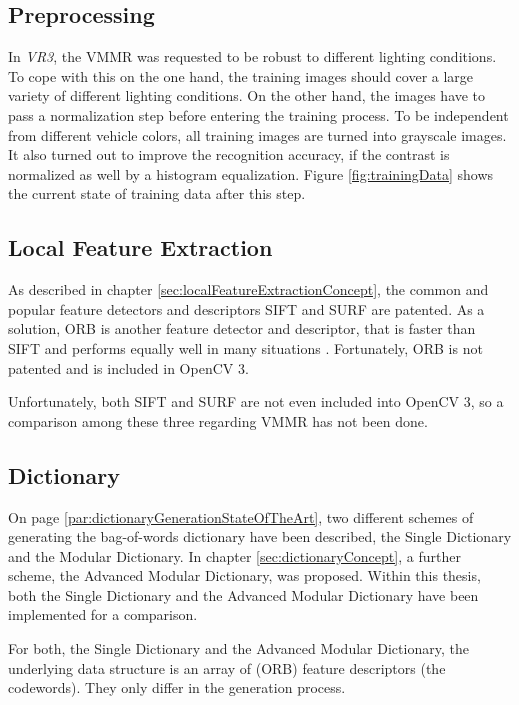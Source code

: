 
\subsection{Preprocessing}\label{sec:preprocessingImpl}
In \emph{VR3}, the VMMR was requested to be robust to different lighting conditions. To cope with this on the one hand, the training images should cover a large variety of different lighting conditions. On the other hand, the images have to pass a normalization step before entering the training process. To be independent from different vehicle colors, all training images are turned into grayscale images. It also turned out to improve the recognition accuracy, if the contrast is normalized as well by a histogram equalization. Figure \ref{fig:trainingData} shows the current state of training data after this step.

\subsection{Local Feature Extraction}\label{sec:localFeatureExtractionImpl}
As described in chapter \ref{sec:localFeatureExtractionConcept}, the common and popular feature detectors and descriptors SIFT and SURF are patented. As a solution, ORB is another feature detector and descriptor, that is faster than SIFT and performs equally well in many situations \citep{rublee2011orb}. Fortunately, ORB is not patented and is included in OpenCV 3.

Unfortunately, both SIFT and SURF are not even included into OpenCV 3, so a comparison among these three regarding VMMR has not been done.

\subsection{Dictionary}\label{sec:dictionaryImpl}
On page \ref{par:dictionaryGenerationStateOfTheArt}, two different schemes of generating the bag-of-words dictionary have been described, the Single Dictionary and the Modular Dictionary. In chapter \ref{sec:dictionaryConcept}, a further scheme, the Advanced Modular Dictionary, was proposed. Within this thesis, both the Single Dictionary and the Advanced Modular Dictionary have been implemented for a comparison.

For both, the Single Dictionary and the Advanced Modular Dictionary, the underlying data structure is an array of (ORB) feature descriptors (the codewords). They only differ in the generation process.

